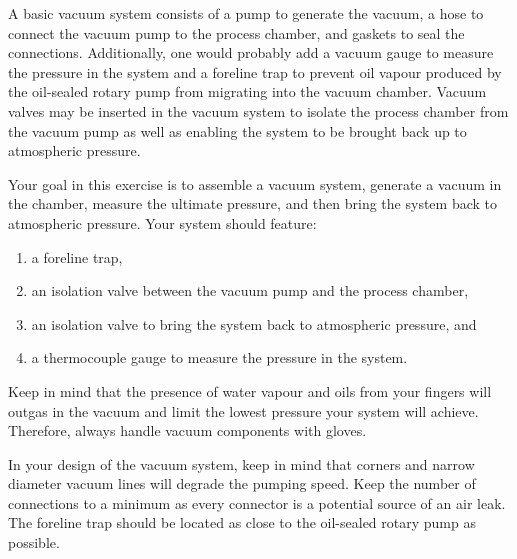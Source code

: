 A basic vacuum system consists of a pump to generate the vacuum, a hose to connect the vacuum pump to the process chamber, and gaskets to seal the connections. Additionally, one would probably add a vacuum gauge to measure the pressure in the system and a foreline trap to prevent oil vapour produced by the oil-sealed rotary pump from migrating into the vacuum chamber. Vacuum valves may be inserted in the vacuum system to isolate the process chamber from the vacuum pump as well as enabling the system to be brought back up to atmospheric pressure.  

Your goal in this exercise is to assemble a vacuum system, generate a vacuum in the chamber, measure the ultimate pressure, and then bring the system back to atmospheric pressure. Your system should feature:
\begin{enumerate}[label={(\arabic*)}]
\item a foreline trap,
\item an isolation valve between the vacuum pump and the process chamber,
\item an isolation valve to bring the system back to atmospheric pressure, and
\item a thermocouple gauge to measure the pressure in the system. 
\end{enumerate}
Keep in mind that the presence of water vapour and oils from your fingers will outgas in the vacuum and limit the lowest pressure your system will achieve. Therefore, always handle vacuum components with gloves.

In your design of the vacuum system, keep in mind that corners and narrow diameter vacuum lines will degrade the pumping speed. Keep the number of connections to a minimum as every connector is a potential source of an air leak. The foreline trap should be located as close to the oil-sealed rotary pump as possible.

